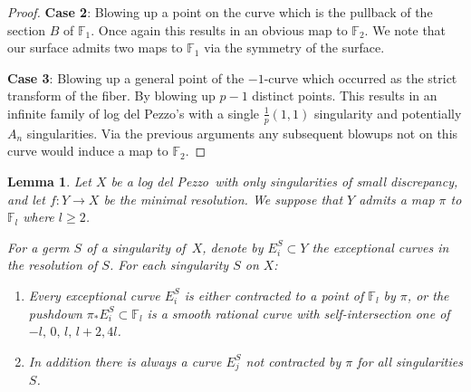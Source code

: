 \documentclass[12pt]{amsbook}
\theoremstyle{plain}
\newtheorem{lem}[thm]{Lemma}
\newcommand{\ldp}{log del Pezzo}
\newcommand{\mb}[1]{\mathbb{#1}}
\newcommand{\minres}{minimal resolution}
\newcommand{\F}{\mathbb{F}}
\begin{document}
\begin{proof}
\textbf{Case 2}: Blowing up a point on the curve which is the pullback of the section $B$ of $\mb{F}_1$. Once again this results in an obvious map to $\mb{F}_2$. We note that our surface admits two maps to $\mb{F}_1$ via the symmetry of the surface.


\textbf{Case 3}:
Blowing up a general point of the $-1$-curve which occurred as the strict transform of the fiber. By blowing up $p-1$ distinct points. This results in an infinite family of \ldp's with a single $\frac{1}{p}(1,1)$ singularity and potentially $A_n$ singularities.
Via the previous arguments any subsequent blowups not on this curve would induce a map to $\mb{F}_2$.
\end{proof}


\begin{lem}\label{HSlem}
Let $X$ be a \ldp\ with only singularities of small discrepancy, and
let $f \colon Y \rightarrow X$ be the \minres. We suppose that $Y$ admits a map $\pi$ to $\mb{F}_l$ where $l \geq 2$.

For a germ $S$ of a singularity of~$X$, denote by
$E_i^S \subset Y$ the exceptional curves in the resolution of $S$.
For each singularity $S$ on $X$:
\begin{enumerate}
\item
Every exceptional curve $E_i^S$ is either contracted to a point of $\mb{F}_l$ by $\pi$,
or the pushdown
$\pi_* E_i^S\subset\F_l$ is a smooth rational curve with self-intersection one of $-l, \,0, \, l, \, l+2, 4l $.
\item
In addition there is always a curve $E_j^S$ not contracted by $\pi$ for all singularities $S$.
\end{enumerate}

\end{lem}
\end{document}
